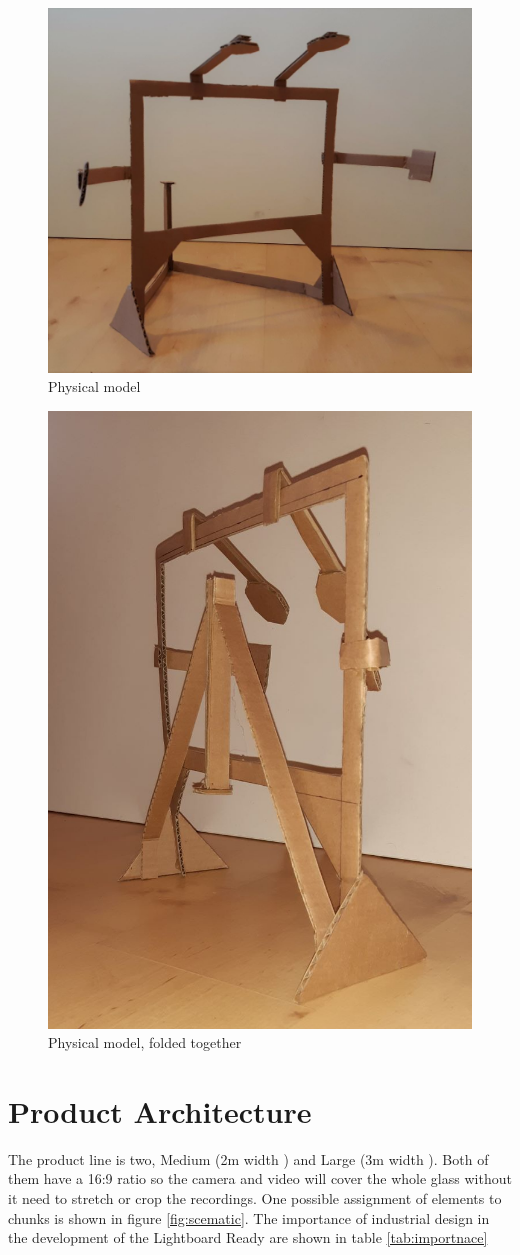 \documentclass[a4paper]{jpconf}
\begin{document}
	\begin{figure}
		\centering 
		\includegraphics[width=0.7\linewidth]{pappi_1.jpg}
		\caption{Physical model}
		\label{fig:pappi_1}
	\end{figure}
	\begin{figure}
		\centering
		\includegraphics[width=0.7\linewidth]{pappi_3.jpg}
		\caption{Physical model, folded together}
		\label{fig:pappi_3}
	\end{figure}
	\section{Product Architecture}
	The product line is two, Medium (2m width ) and Large (3m width ). Both of them have a 16:9 ratio so the camera and video will cover the whole glass without it need to stretch or crop the recordings.
	One possible assignment of elements to chunks is shown in figure \ref{fig:scematic}.
	The importance of industrial design in the development of the Lightboard Ready are shown in table \ref{tab:importnace}
	
\end{document}
